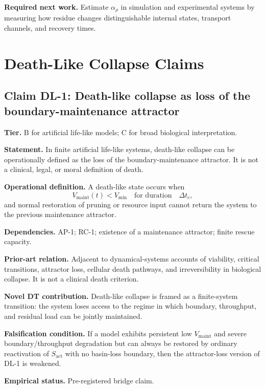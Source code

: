 \documentclass[10pt,a4paper,twocolumn,aps,prl]{revtex4-2}
\theoremstyle{claimstyle}
\theoremstyle{definition}
\newcommand{\claimfield}[1]{\noindent\textbf{#1.}}
\newcommand{\Sactive}{S_{\mathrm{act}}}
\newcommand{\Vlife}{V_{\mathrm{maint}}}
\begin{document}
\claimfield{Required next work} Estimate $\alpha_\rho$ in simulation and experimental systems by measuring how residue changes distinguishable internal states, transport channels, and recovery times.

\section{Death-Like Collapse Claims}

\subsection{Claim DL-1: Death-like collapse as loss of the boundary-maintenance attractor}

\claimfield{Tier} B for artificial life-like models; C for broad biological interpretation.

\claimfield{Statement} In finite artificial life-like systems, death-like collapse can be operationally defined as the loss of the boundary-maintenance attractor. It is not a clinical, legal, or moral definition of death.

\claimfield{Operational definition} A death-like state occurs when
\begin{equation}
\Vlife(t)<V_{\min}\quad \text{for duration}\quad \Delta t_c,
\end{equation}
and normal restoration of pruning or resource input cannot return the system to the previous maintenance attractor.

\claimfield{Dependencies} AP-1; RC-1; existence of a maintenance attractor; finite rescue capacity.

\claimfield{Prior-art relation} Adjacent to dynamical-systems accounts of viability, critical transitions, attractor loss, cellular death pathways, and irreversibility in biological collapse. It is not a clinical death criterion.

\claimfield{Novel DT contribution} Death-like collapse is framed as a finite-system transition: the system loses access to the regime in which boundary, throughput, and residual load can be jointly maintained.

\claimfield{Falsification condition} If a model exhibits persistent low $\Vlife$ and severe boundary/throughput degradation but can always be restored by ordinary reactivation of $\Sactive$ with no basin-loss boundary, then the attractor-loss version of DL-1 is weakened.

\claimfield{Empirical status} Pre-registered bridge claim.
\end{document}
